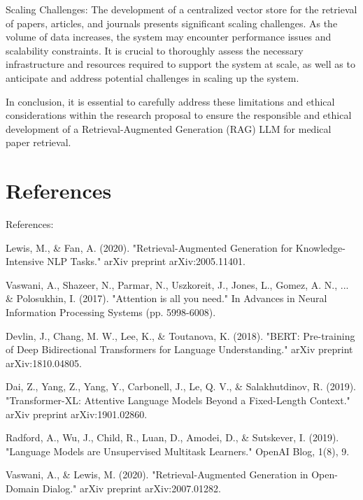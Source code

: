\documentclass{article}
\begin{document}
Scaling Challenges: The development of a centralized vector store for the retrieval of papers, articles, and journals presents significant scaling challenges. As the volume of data increases, the system may encounter performance issues and scalability constraints. It is crucial to thoroughly assess the necessary infrastructure and resources required to support the system at scale, as well as to anticipate and address potential challenges in scaling up the system.

In conclusion, it is essential to carefully address these limitations and ethical considerations within the research proposal to ensure the responsible and ethical development of a Retrieval-Augmented Generation (RAG) LLM for medical paper retrieval.

\section*{References}
References:

Lewis, M., \& Fan, A. (2020). "Retrieval-Augmented Generation for Knowledge-Intensive NLP Tasks." arXiv preprint arXiv:2005.11401.

Vaswani, A., Shazeer, N., Parmar, N., Uszkoreit, J., Jones, L., Gomez, A. N., ... \& Polosukhin, I. (2017). "Attention is all you need." In Advances in Neural Information Processing Systems (pp. 5998-6008).

Devlin, J., Chang, M. W., Lee, K., \& Toutanova, K. (2018). "BERT: Pre-training of Deep Bidirectional Transformers for Language Understanding." arXiv preprint arXiv:1810.04805.

Dai, Z., Yang, Z., Yang, Y., Carbonell, J., Le, Q. V., \& Salakhutdinov, R. (2019). "Transformer-XL: Attentive Language Models Beyond a Fixed-Length Context." arXiv preprint arXiv:1901.02860.

Radford, A., Wu, J., Child, R., Luan, D., Amodei, D., \& Sutskever, I. (2019). "Language Models are Unsupervised Multitask Learners." OpenAI Blog, 1(8), 9.

Vaswani, A., \& Lewis, M. (2020). "Retrieval-Augmented Generation in Open-Domain Dialog." arXiv preprint arXiv:2007.01282.
\end{document}
